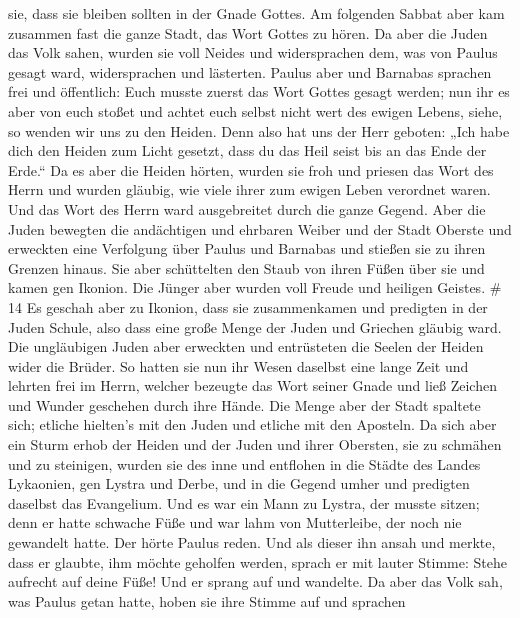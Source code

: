 sie, dass sie bleiben sollten in der Gnade Gottes.  Am
folgenden Sabbat aber kam zusammen fast die ganze Stadt, das Wort Gottes
zu hören.  Da aber die Juden das Volk sahen, wurden sie
voll Neides und widersprachen dem, was von Paulus gesagt ward,
widersprachen und lästerten.  Paulus aber und Barnabas
sprachen frei und öffentlich: Euch musste zuerst das Wort Gottes gesagt
werden; nun ihr es aber von euch stoßet und achtet euch selbst nicht
wert des ewigen Lebens, siehe, so wenden wir uns zu den Heiden.
 Denn also hat uns der Herr geboten: „Ich habe dich den
Heiden zum Licht gesetzt, dass du das Heil seist bis an das Ende der
Erde.``  Da es aber die Heiden hörten, wurden sie froh und
priesen das Wort des Herrn und wurden gläubig, wie viele ihrer zum
ewigen Leben verordnet waren.  Und das Wort des Herrn ward
ausgebreitet durch die ganze Gegend.  Aber die Juden
bewegten die andächtigen und ehrbaren Weiber und der Stadt Oberste und
erweckten eine Verfolgung über Paulus und Barnabas und stießen sie zu
ihren Grenzen hinaus.  Sie aber schüttelten den Staub von
ihren Füßen über sie und kamen gen Ikonion.  Die Jünger
aber wurden voll Freude und heiligen Geistes. \# 14  Es
geschah aber zu Ikonion, dass sie zusammenkamen und predigten in der
Juden Schule, also dass eine große Menge der Juden und Griechen gläubig
ward.  Die ungläubigen Juden aber erweckten und entrüsteten
die Seelen der Heiden wider die Brüder.  So hatten sie nun
ihr Wesen daselbst eine lange Zeit und lehrten frei im Herrn, welcher
bezeugte das Wort seiner Gnade und ließ Zeichen und Wunder geschehen
durch ihre Hände.  Die Menge aber der Stadt spaltete sich;
etliche hielten's mit den Juden und etliche mit den Aposteln.
 Da sich aber ein Sturm erhob der Heiden und der Juden und
ihrer Obersten, sie zu schmähen und zu steinigen,  wurden
sie des inne und entflohen in die Städte des Landes Lykaonien, gen
Lystra und Derbe, und in die Gegend umher  und predigten
daselbst das Evangelium.  Und es war ein Mann zu Lystra, der
musste sitzen; denn er hatte schwache Füße und war lahm von Mutterleibe,
der noch nie gewandelt hatte.  Der hörte Paulus reden. Und
als dieser ihn ansah und merkte, dass er glaubte, ihm möchte geholfen
werden,  sprach er mit lauter Stimme: Stehe aufrecht auf
deine Füße! Und er sprang auf und wandelte.  Da aber das
Volk sah, was Paulus getan hatte, hoben sie ihre Stimme auf und sprachen
